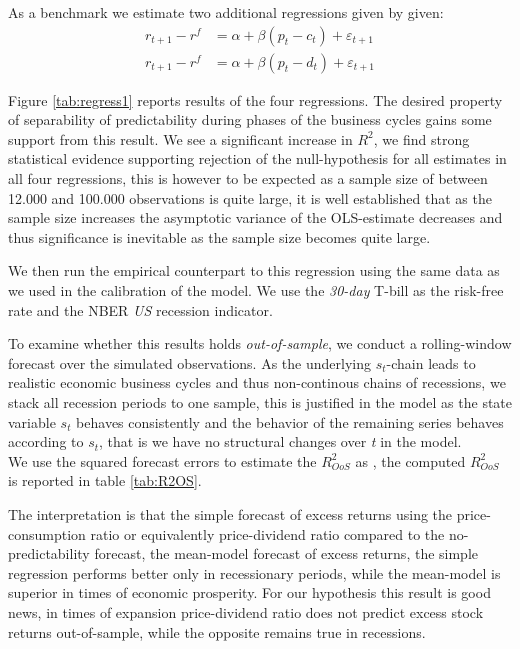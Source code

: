 As a benchmark we estimate two additional regressions given by given:
\begin{align*}
     r_{t+1} - r^{f} &= \alpha + \beta \left( p_t - c_t \right)  + \varepsilon_{t+1}\\
      r_{t+1} - r^{f} &= \alpha + \beta \left( p_t - d_t \right) + \varepsilon_{t+1}
\end{align*}

Figure \ref{tab:regress1} reports results of the four regressions. The desired property of separability of predictability during phases of the business cycles gains some support from this result. We see a significant increase in $R^2$, we find strong statistical evidence supporting rejection of the null-hypothesis for all estimates in all four regressions, this is however to be expected as a sample size of between 12.000 and 100.000 observations is quite large, it is well established that as the sample size increases the asymptotic variance of the OLS-estimate decreases and thus significance is inevitable as the sample size becomes quite large.




We then run the empirical counterpart to this regression using the same data as we used in the calibration of the model. We use the \textit{30-day} T-bill as the risk-free rate and the NBER \textit{US} recession indicator. 




To examine whether this results holds \textit{out-of-sample}, we conduct a rolling-window forecast over the simulated observations. As the underlying $s_t$-chain leads to realistic economic business cycles and thus non-continous chains of recessions, we stack all recession periods to one sample, this is justified in the model as the state variable $s_t$ behaves consistently and the behavior of the remaining series behaves according to $s_t$, that is we have no structural changes over \textit{t} in the model. \\
We use the squared forecast errors to estimate the $R^2_{OoS}$ as \citet{CT2005}, the computed $R^2_{OoS}$ is reported in table \ref{tab:R2OS}. 



The interpretation is that the simple forecast of excess returns using the price-consumption ratio or equivalently price-dividend ratio compared to the no-predictability forecast, the mean-model forecast of excess returns, the simple regression performs better only in recessionary periods, while the mean-model is superior in times of economic prosperity. For our hypothesis this result is good news, in times of expansion price-dividend ratio does not predict excess stock returns out-of-sample, while the opposite remains true in recessions.\\


